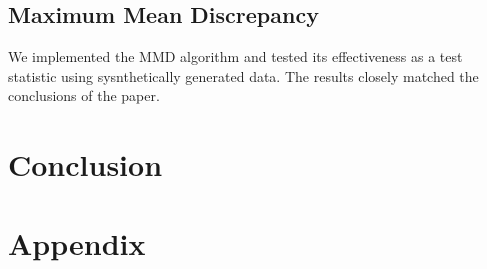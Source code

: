 \documentclass{article}
\begin{document}

\subsection{Maximum Mean Discrepancy}
We implemented the MMD algorithm and tested its effectiveness as a test statistic using sysnthetically generated data. The results closely matched the conclusions of the paper. 





\section{Conclusion}

\section*{Appendix}



\end{document}
